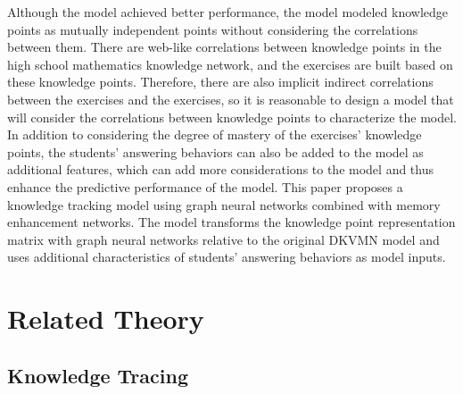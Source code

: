 Although the model achieved better performance, the model modeled knowledge points as mutually independent points without considering the correlations between them. There are web-like correlations between knowledge points in the high school mathematics knowledge network, and the exercises are built based on these knowledge points. Therefore, there are also implicit indirect correlations between the exercises and the exercises, so it is reasonable  to design a model that will consider the correlations between knowledge points to characterize the model. In addition to considering the degree of mastery of the exercises' knowledge points, the students' answering behaviors can also be added to the model as additional features, which can add more considerations to the model and thus enhance the predictive performance of the model. This paper proposes a knowledge tracking model using graph neural networks combined with memory enhancement networks. The model transforms the knowledge point representation matrix with graph neural networks relative to the original DKVMN model and uses additional characteristics of students' answering behaviors as model inputs.


\section{Related Theory}
\subsection{Knowledge Tracing}


